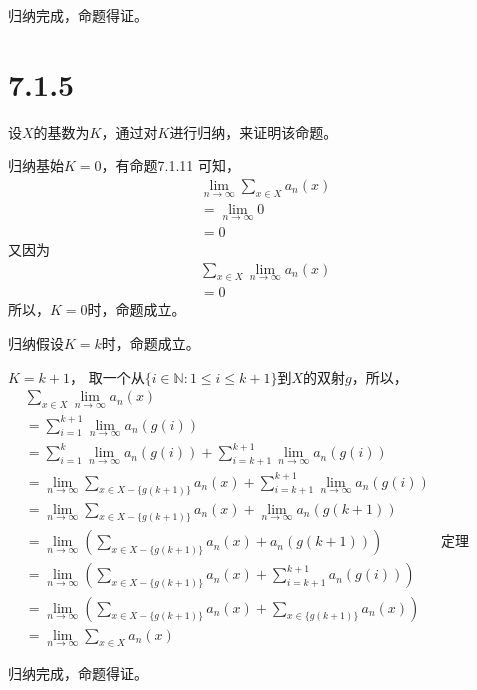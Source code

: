\documentclass{article}
\theoremstyle{mystyle}
\begin{document}
归纳完成，命题得证。

\section*{7.1.5}

设$X$的基数为$K$，通过对$K$进行归纳，来证明该命题。

归纳基始$K=0$，有命题7.1.11 可知，
\begin{align*}
         & \lim\limits_{n \rightarrow \infty} \sum\limits_{x \in X} a_n(x) \\
         & = \lim\limits_{n \rightarrow \infty} 0                          \\
         & = 0
\end{align*}
又因为
\begin{align*}
         & \sum\limits_{x \in X} \lim\limits_{n \rightarrow \infty} a_n(x) \\
         & = 0
\end{align*}
所以，$K=0$时，命题成立。

归纳假设$K = k$时，命题成立。

$K = k + 1$，
取一个从$\{i \in \mathbb{N}: 1 \leq i \leq k+1\}$到$X$的双射$g$，所以，
\begin{align*}
          & \sum\limits_{x \in X} \lim\limits_{n \rightarrow \infty} a_n(x)                \\
          & = \sum\limits_{i = 1}^{k+1} \lim\limits_{n \rightarrow \infty} a_n(g(i))       \\
          & = \sum\limits_{i = 1}^{k} \lim\limits_{n \rightarrow \infty} a_n(g(i))
        +
        \sum\limits_{i = k+1}^{k+1} \lim\limits_{n \rightarrow \infty} a_n(g(i))           \\
          & = \lim\limits_{n \rightarrow \infty} \sum\limits_{x \in X-\{g(k+1)\}} a_n(x)
        +
        \sum\limits_{i = k+1}^{k+1} \lim\limits_{n \rightarrow \infty} a_n(g(i))           \\
          & = \lim\limits_{n \rightarrow \infty} \sum\limits_{x \in X-\{g(k+1)\}} a_n(x)
        +
        \lim\limits_{n \rightarrow \infty} a_n(g(k+1))                                     \\
          & = \lim\limits_{n \rightarrow \infty}  (\sum\limits_{x \in X-\{g(k+1)\}} a_n(x)
        +
        a_n(g(k+1))
        ) & \textbf{定理6.1.19（a）}                                                           \\
          & = \lim\limits_{n \rightarrow \infty}  (\sum\limits_{x \in X-\{g(k+1)\}} a_n(x)
        +
        \sum\limits_{i = k+1}^{k+1} a_n(g(i))
        )                                                                                  \\
          & = \lim\limits_{n \rightarrow \infty}  (\sum\limits_{x \in X-\{g(k+1)\}} a_n(x)
        +
        \sum\limits_{x \in \{g(k+1)\}} a_n(x)
        )                                                                                  \\
          & = \lim\limits_{n \rightarrow \infty} \sum\limits_{x \in X} a_n(x)
\end{align*}

归纳完成，命题得证。
\end{document}
